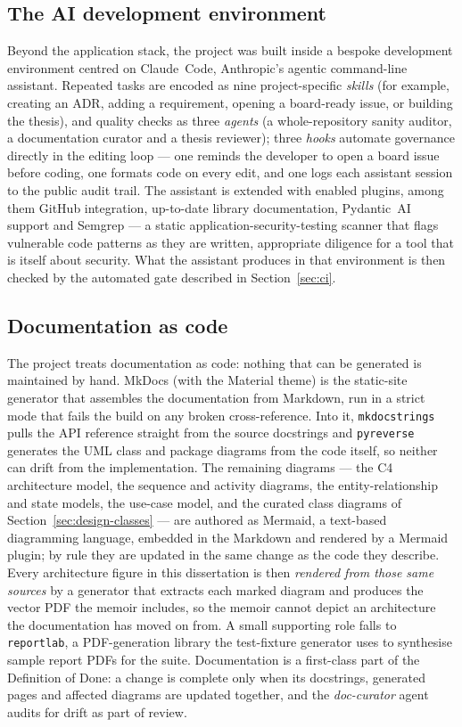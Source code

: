 \subsection{The AI development environment}
\label{subsec:ai-env}

Beyond the application stack, the project was built inside a bespoke development
environment centred on Claude~Code, Anthropic's agentic command-line assistant.
Repeated tasks are encoded as nine project-specific \emph{skills} (for example,
creating an ADR, adding a requirement, opening a board-ready issue, or building the
thesis), and quality checks as three \emph{agents} (a whole-repository sanity
auditor, a documentation curator and a thesis reviewer); three \emph{hooks} automate
governance directly in the editing loop --- one reminds the developer to open a board
issue before coding, one formats code on every edit, and one logs each assistant
session to the public audit trail. The assistant is extended with enabled plugins,
among them GitHub integration, up-to-date library documentation, Pydantic~AI support
and Semgrep --- a static application-security-testing scanner that flags vulnerable
code patterns as they are written, appropriate diligence for a tool that is itself
about security. What the assistant produces in that environment is then checked by
the automated gate described in Section~\ref{sec:ci}.

\subsection{Documentation as code}
\label{subsec:docs}

The project treats documentation as code: nothing that can be generated is
maintained by hand. MkDocs (with the Material theme) is the static-site generator
that assembles the documentation from Markdown, run in a strict mode that fails the
build on any broken cross-reference. Into it, \texttt{mkdocstrings} pulls the API
reference straight from the source docstrings and \texttt{pyreverse} generates the
UML class and package diagrams from the code itself, so neither can drift from the
implementation. The remaining diagrams --- the C4 architecture model, the sequence
and activity diagrams, the entity-relationship and state models, the use-case model,
and the curated class diagrams of Section~\ref{sec:design-classes} --- are authored
as Mermaid, a text-based diagramming language, embedded in the Markdown and rendered
by a Mermaid plugin; by rule they are updated in the same change as the code they
describe. Every architecture figure in this dissertation is then \emph{rendered from
those same sources} by a generator that extracts each marked diagram and produces
the vector PDF the memoir includes, so the memoir cannot depict an architecture the
documentation has moved on from. A small supporting role falls to \texttt{reportlab}, a PDF-generation
library the test-fixture generator uses to synthesise sample report PDFs for the
suite. Documentation is a first-class
part of the Definition of Done: a change is complete only when its docstrings,
generated pages and affected diagrams are updated together, and the
\emph{doc-curator} agent audits for drift as part of review.

